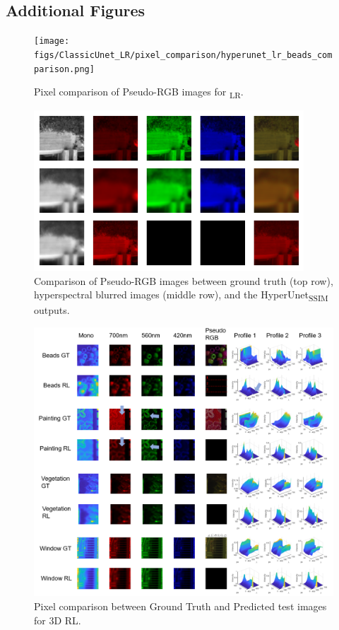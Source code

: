 \documentclass{article}
\begin{document}
\subsection{Additional Figures}


\begin{figure}[!h]
\centering
\texttt{[image: figs/ClassicUnet\_LR/pixel\_comparison/hyperunet\_lr\_beads\_comparison.png]}
    \caption{Pixel comparison of Pseudo-RGB images for \textsubscript{LR}.}
    \label{fig:hyperunet_lr_beads}
\end{figure}

\begin{figure}[!h]
\centering
\includegraphics[width=0.9\textwidth]{figs/ClassicUnetSSIM_LR/pixel_comparison/4423_test3_ssim.png}
    \caption{Comparison of Pseudo-RGB images between ground truth (top row), hyperspectral blurred images (middle row), and the HyperUnet\textsubscript{SSIM} outputs.}
    \label{fig:degeneration_mode}
\end{figure}

\begin{figure}[!htb]
    \centering
\includegraphics[width=\textwidth]{figs/RL/RLcompare.png}
    \caption{Pixel comparison between Ground Truth and Predicted test images for 3D RL.}
    \label{fig:RLCompare}
\end{figure}
\end{document}
